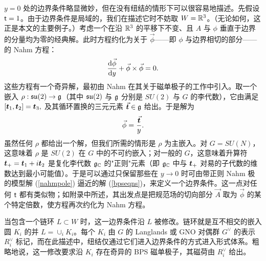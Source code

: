 $y=0$ 处的边界条件略显微妙，但在没有纽结的情形下可以很容易地描述。先假设 $\t=1$。由于边界条件是局域的，我们在描述它时不妨取 $W=\R^3$。（无论如何，这正是本文的主要例子。）考虑一个在沿 $\R^3$ 的平移下不变、且 $A$ 与 $\phi$ 垂直于边界的分量均为零的经典解。此时方程约化为关于 $\vec\phi$——即 $\phi$ 与边界相切的部分——的 Nahm 方程：
\begin{equation}\label{nahm}\frac{\d \vec\phi}{\d y}+\vec\phi\times \vec\phi = 0. \end{equation}
这些方程有一个奇异解，最初由 Nahm 在其关于磁单极子的工作中引入。取一个嵌入  $\rho:\frak{su}(2)\to \frak g$（其中 $\frak{su}(2)$ 与 $\frak g$ 分别是 $SU(2)$ 与 $G$ 的李代数），它由满足 $[\ct_1,\ct_2]=\ct_3,$ 及其循环置换的三元元素 $\vec \ct\in \frak g$ 给出。于是解为
\begin{equation}\label{nahmpole}\vec\phi=\frac{\vec \ct}{y}. \end{equation}
虽然任何 $\rho $ 都给出一个解，但我们所需的情形是 $\rho$ 为主嵌入。对 $G=SU(N)$，这意味着 $\rho$ 是 $SU(2)$ 在 $G$ 中的不可约嵌入；对一般的 $G$，这意味着升算符 $\ct_+=\ct_1+i\ct_2$ 是复化李代数 $\frak g_\C$ 的"正则"元素（即 $\frak g_\C$ 中与 $\ct_+$ 对易的子代数的维数达到最小可能值）。于是可以通过只保留那些在 $y\to 0$ 时可由带正则 Nahm 极的模型解 (\ref{nahmpole}) 逼近的解 (\ref{bpseqns})，来定义一个边界条件。这一点对任何 $\t$ 都有类似物；如附录中所述，其出发点是把规范场的切向部分 $\vec A$ 取为 $\vec\phi$ 的某个特定倍数，使方程再次约化为 Nahm 方程。

当包含一个链环 $L\subset W$ 时，这一边界条件沿 $L$ 被修改。链环就是互不相交的嵌入圆 $K_i$ 的并 $L=\cup_iK_i$。每个 $K_i$ 由 $G$ 的 Langlands 或 GNO 对偶群 $ G^\vee$ 的表示 $R^\vee_i$ 标记，而在此描述中，纽结仅通过它们进入边界条件的方式进入形式体系。粗略地说，这一修改要求沿 $K_i$ 存在奇异的 BPS 磁单极子，其磁荷由 $R^\vee_i$ 给出。


